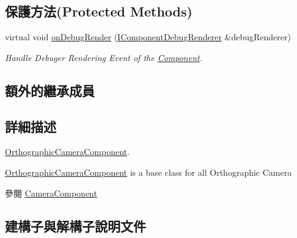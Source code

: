 \subsection*{保護方法(Protected Methods)}
\begin{DoxyCompactItemize}
\item 
virtual void \hyperlink{class_magnum_1_1_orthographic_camera_component_a09cb1a792cd8e06b3ace4c99f0e89882}{on\+Debug\+Render} (\hyperlink{class_magnum_1_1_i_component_debug_renderer}{I\+Component\+Debug\+Renderer} \&debug\+Renderer)\hypertarget{class_magnum_1_1_orthographic_camera_component_a09cb1a792cd8e06b3ace4c99f0e89882}{}\label{class_magnum_1_1_orthographic_camera_component_a09cb1a792cd8e06b3ace4c99f0e89882}

\begin{DoxyCompactList}\small\item\em Handle Debuger Rendering Event of the \hyperlink{class_magnum_1_1_component}{Component}. \end{DoxyCompactList}\end{DoxyCompactItemize}
\subsection*{額外的繼承成員}


\subsection{詳細描述}
\hyperlink{class_magnum_1_1_orthographic_camera_component}{Orthographic\+Camera\+Component}. 

\hyperlink{class_magnum_1_1_orthographic_camera_component}{Orthographic\+Camera\+Component} is a base class for all Orthographic Camera \begin{DoxySeeAlso}{參閱}
\hyperlink{class_magnum_1_1_camera_component}{Camera\+Component} 
\end{DoxySeeAlso}


\subsection{建構子與解構子說明文件}
